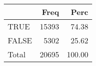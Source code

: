 
\begin{tabular}[t]{lrr}
\toprule
  & Freq & Perc\\
\midrule
TRUE & 15393 & 74.38\\
FALSE & 5302 & 25.62\\
Total & 20695 & 100.00\\
\bottomrule
\end{tabular}